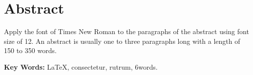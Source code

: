 \chapter*{Abstract}
Apply the font of Times New Roman to the paragraphs of the abstract using font size of 12. An abstract is usually one to three paragraphs long with a length of 150 to 350 words.

\textbf{Key Words:} \LaTeX{}, consectetur, rutrum, 6words.